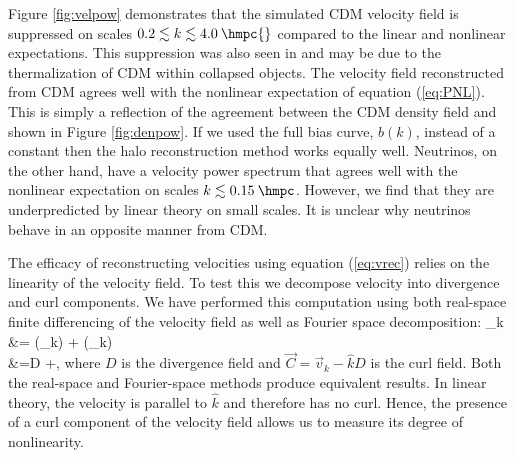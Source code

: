 Figure \ref{fig:velpow} demonstrates that the simulated CDM velocity field is suppressed on scales $0.2 \lesssim k \lesssim 4.0 \:\hmpc{}$ compared to the linear and nonlinear expectations. This suppression was also seen in \citet{pueblas/scoccimarro:2009,hahn/etal:2014} and may be due to the thermalization of CDM within collapsed objects.  The velocity field reconstructed from CDM agrees well with the nonlinear expectation of equation (\ref{eq:PNL}). This is simply a reflection of the agreement between the CDM density field and \hfit{} shown in Figure \ref{fig:denpow}. If we used the full bias curve, $b(k)$, instead of a constant then the halo reconstruction method works equally well.  Neutrinos, on the other hand, have a velocity power spectrum that agrees well with the nonlinear expectation on scales $k\lesssim 0.15 \:\hmpc$.  However, we find that they are underpredicted by linear theory on small scales.  It is unclear why neutrinos behave in an opposite manner from CDM.

The efficacy of reconstructing velocities using equation (\ref{eq:vrec}) relies on the linearity of the velocity field. To test this we decompose velocity into divergence and curl components. We have performed this computation using both real-space finite differencing of the velocity field as well as Fourier space decomposition:
\bqa
{}_k &= (\cdot{}_k) + \times(\times{}_k) \nonumber \\
                &=D +,
\label{eqn:divcurl}
\eqa 
where $D$ is the divergence field and $\vec{C} = \vec{v}_k - \hat{k}D$ is the curl field. Both the real-space and Fourier-space methods produce equivalent results. In linear theory, the velocity is parallel to $\hat{k}$ and therefore has no curl. Hence, the presence of a curl component of the velocity field allows us to measure its degree of nonlinearity.
 
